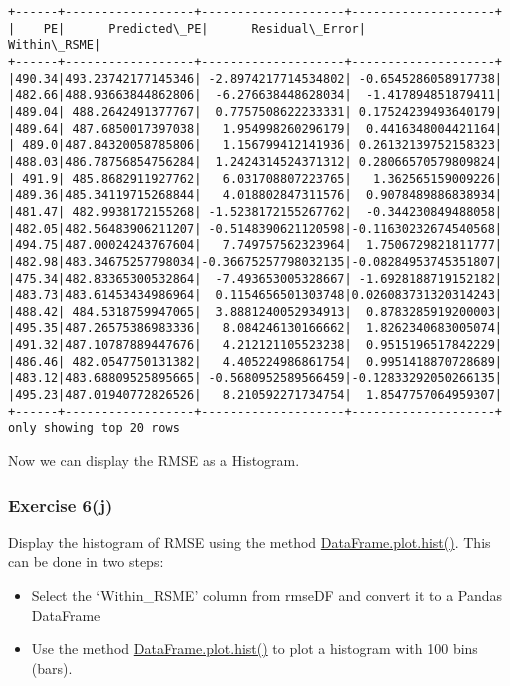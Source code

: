\documentclass[11pt]{article}
\providecommand{\tightlist}{%
      \setlength{\itemsep}{0pt}\setlength{\parskip}{0pt}}
\begin{document}
    \begin{Verbatim}[commandchars=\\\{\}]
+------+------------------+--------------------+--------------------+
|    PE|      Predicted\_PE|      Residual\_Error|         Within\_RSME|
+------+------------------+--------------------+--------------------+
|490.34|493.23742177145346| -2.8974217714534802| -0.6545286058917738|
|482.66|488.93663844862806|  -6.276638448628034|  -1.417894851879411|
|489.04| 488.2642491377767|  0.7757508622233331| 0.17524239493640179|
|489.64| 487.6850017397038|   1.954998260296179|  0.4416348004421164|
| 489.0|487.84320058785806|   1.156799412141936| 0.26132139752158323|
|488.03|486.78756854756284|  1.2424314524371312| 0.28066570579809824|
| 491.9| 485.8682911927762|   6.031708807223765|   1.362565159009226|
|489.36|485.34119715268844|   4.018802847311576|  0.9078489886838934|
|481.47| 482.9938172155268| -1.5238172155267762|  -0.344230849488058|
|482.05|482.56483906211207| -0.5148390621120598|-0.11630232674540568|
|494.75|487.00024243767604|   7.749757562323964|  1.7506729821811777|
|482.98|483.34675257798034|-0.36675257798032135|-0.08284953745351807|
|475.34|482.83365300532864|  -7.493653005328667| -1.6928188719152182|
|483.73|483.61453434986964|  0.1154656501303748|0.026083731320314243|
|488.42| 484.5318759947065|  3.8881240052934913|  0.8783285919200003|
|495.35|487.26575386983336|   8.084246130166662|  1.8262340683005074|
|491.32|487.10787889447676|   4.212121105523238|  0.9515196517842229|
|486.46| 482.0547750131382|   4.405224986861754|  0.9951418870728689|
|483.12|483.68809525895665| -0.5680952589566459|-0.12833292050266135|
|495.23|487.01940772826526|   8.210592271734754|  1.8547757064959307|
+------+------------------+--------------------+--------------------+
only showing top 20 rows
    \end{Verbatim}

    Now we can display the RMSE as a Histogram.

\hypertarget{exercise-6j}{%
\subsubsection{Exercise 6(j)}\label{exercise-6j}}

Display the histogram of RMSE using the method
\href{https://pandas.pydata.org/docs/reference/api/pandas.DataFrame.plot.hist.html?highlight=hist\#pandas.DataFrame.plot.hist}{DataFrame.plot.hist()}.
This can be done in two steps:

\begin{itemize}
\tightlist
\item
  Select the `Within\_RSME' column from rmseDF and convert it to a
  Pandas DataFrame
\item
  Use the method
  \href{https://pandas.pydata.org/docs/reference/api/pandas.DataFrame.plot.hist.html?highlight=hist\#pandas.DataFrame.plot.hist}{DataFrame.plot.hist()}
  to plot a histogram with 100 bins (bars).
\end{itemize}
\end{document}
